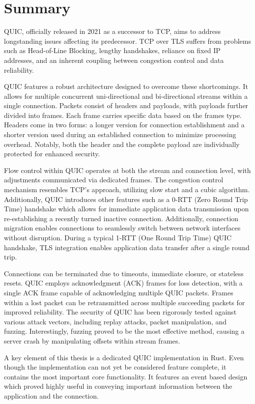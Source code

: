 \chapter{Summary}
QUIC, officially released in 2021 as a successor to TCP, aims to address longstanding issues affecting its predecessor. TCP over TLS
suffers from problems such as Head-of-Line Blocking, lengthy handshakes, reliance on fixed IP addresses, and an inherent coupling
between congestion control and data reliability.

QUIC features a robust architecture designed to overcome these shortcomings. It allows for multiple concurrent uni-directional and
bi-directional streams within a single connection. Packets consist of headers and payloads, with payloads further divided into
frames. Each frame carries specific data based on the frames type. Headers come in two forms: a longer version for connection
establishment and a shorter version used during an established connection to minimize processing overhead. Notably, both the header
and the complete payload are individually protected for enhanced security.

Flow control within QUIC operates at both the stream and connection level, with adjustments communicated via dedicated frames. The
congestion control mechanism resembles TCP's approach, utilizing slow start and a cubic algorithm. Additionally, QUIC introduces
other features such as a 0-RTT (Zero Round Trip Time) handshake which allows for immediate application data transmission upon
re-establishing a recently turned inactive connection. Additionally, connection migration enables connections to seamlessly
switch between network interfaces without disruption. During a typical 1-RTT (One Round Trip Time) QUIC handshake, TLS integration
enables application data transfer after a single round trip.

Connections can be terminated due to timeouts, immediate closure, or stateless resets. QUIC employs acknowledgment (ACK) frames for
loss detection, with a single ACK frame capable of acknowledging multiple QUIC packets. Frames within a lost packet can be retransmitted
across multiple succeeding packets for improved reliability. The security of QUIC has been rigorously tested against various attack vectors,
including replay attacks, packet manipulation, and fuzzing. Interestingly, fuzzing proved to be the most effective method, causing
a server crash by manipulating offsets within stream frames.

A key element of this thesis is a dedicated QUIC implementation in Rust. Even though the implementation can not yet be considered
feature complete, it contains the most important core functionality. It features an event based design which proved highly useful
in conveying important information between the application and the connection.

